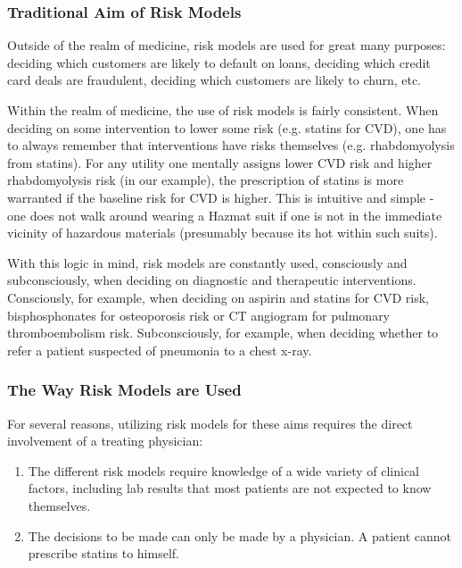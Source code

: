 \documentclass[a4paper,12pt]{article}
\begin{document}
			\subsubsection{Traditional Aim of Risk Models}
			
			Outside of the realm of medicine, risk models are used for great many purposes: deciding which customers are likely to default on loans, deciding which credit card deals are fraudulent, deciding which customers are likely to churn, etc.
			
			Within the realm of medicine, the use of risk models is fairly consistent. When deciding on some intervention to lower some risk (e.g. statins for CVD), one has to always remember that interventions have risks themselves (e.g. rhabdomyolysis from statins). For any utility one mentally assigns lower CVD risk and higher rhabdomyolysis risk (in our example), the prescription of statins is more warranted if the baseline risk for CVD is higher. This is intuitive and simple - one does not walk around wearing a Hazmat suit if one is not in the immediate vicinity of hazardous materials (presumably because its hot within such suits).
			
			With this logic in mind, risk models are constantly used, consciously and subconsciously, when deciding on diagnostic and therapeutic interventions. Consciously, for example, when deciding on aspirin and statins for CVD risk\cite{Goff2014,Bibbins-Domingo2016}, bisphosphonates for osteoporosis risk \cite{Jeremiah2015} or CT angiogram for pulmonary thromboembolism risk\cite{Wells2001}. Subconsciously, for example, when deciding whether to refer a patient suspected of pneumonia to a chest x-ray.
			
			\subsubsection{The Way Risk Models are Used}
			
			For several reasons, utilizing risk models for these aims requires the direct involvement of a treating physician:
			\begin{enumerate}
				\item The different risk models require knowledge of a wide variety of clinical factors, including lab results that most patients are not expected to know themselves.
				\item The decisions to be made can only be made by a physician. A patient cannot prescribe statins to himself.
			\end{enumerate}
			
\end{document}
